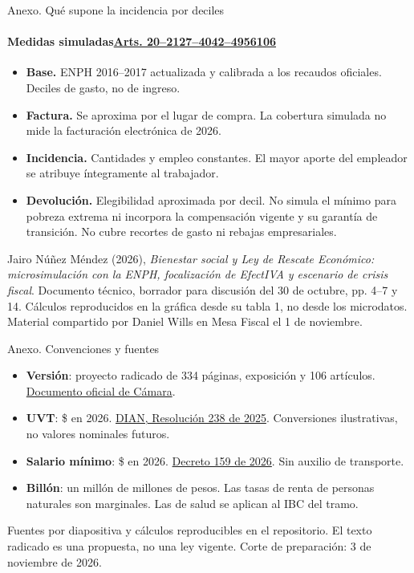 \documentclass[aspectratio=169,11pt]{beamer}
\newcommand{\src}[1]{\par\vfill{\fontsize{7.3}{8.4}\selectfont\color{muted}#1\par}}
\newcommand{\ley}[2]{\href{https://www.camara.gov.co/wp-content/uploads/2026/10/proyectos-ley/documentos/proyecto-36548/PROYECTO-DE-LEY-Rescate-Economico-2026-VSD-RADICADA-1.pdf\#page=#1}{#2}}
\newcommand{\bulletspace}{\setlength\itemsep{7pt}}
\begin{document}
\begin{frame}{Anexo. Qué supone la incidencia por deciles}
\framesubtitle{Medidas simuladas\quad \ley{228}{Arts. 20--21}\quad \ley{234}{27--40}\quad \ley{248}{42--49}\quad \ley{262}{56}\quad \ley{333}{106}}
\begin{itemize}\bulletspace
\item \textbf{Base.} ENPH 2016--2017 actualizada y calibrada a los recaudos oficiales. Deciles de gasto, no de ingreso.
\item \textbf{Factura.} Se aproxima por el lugar de compra. La cobertura simulada no mide la facturación electrónica de 2026.
\item \textbf{Incidencia.} Cantidades y empleo constantes. El mayor aporte del empleador se atribuye íntegramente al trabajador.
\item \textbf{Devolución.} Elegibilidad aproximada por decil. No simula el mínimo para pobreza extrema ni incorpora la compensación vigente y su garantía de transición. No cubre recortes de gasto ni rebajas empresariales.
\end{itemize}
\src{Jairo Núñez Méndez (2026), \emph{Bienestar social y Ley de Rescate Económico: microsimulación con la ENPH, focalización de EfectIVA y escenario de crisis fiscal}. Documento técnico, borrador para discusión del 30 de octubre, pp. 4--7 y 14. Cálculos reproducidos en la gráfica desde su tabla 1, no desde los microdatos. Material compartido por Daniel Wills en Mesa Fiscal el 1 de noviembre.}
\end{frame}

\begin{frame}{Anexo. Convenciones y fuentes}
\small
\begin{itemize}\bulletspace
\item \textbf{Versión}: proyecto radicado de 334 páginas, exposición y 106 artículos. \ley{1}{Documento oficial de Cámara}.
\item \textbf{UVT}: \$\UVTpesos{} en 2026. \href{https://www.dian.gov.co/normatividad/Normatividad/Resoluci\%C3\%B3n\%20000238\%20de\%2015-12-2025.Pdf}{DIAN, Resolución 238 de 2025}. Conversiones ilustrativas, no valores nominales futuros.
\item \textbf{Salario mínimo}: \$\SMpesos{} en 2026. \href{https://normograma.sena.edu.co/compilacion/docs/decreto_0159_2026.htm}{Decreto 159 de 2026}. Sin auxilio de transporte.
\item \textbf{Billón}: un millón de millones de pesos. Las tasas de renta de personas naturales son marginales. Las de salud se aplican al IBC del tramo.
\end{itemize}
\src{Fuentes por diapositiva y cálculos reproducibles en el repositorio. El texto radicado es una propuesta, no una ley vigente. Corte de preparación: 3 de noviembre de 2026.}
\end{frame}
\end{document}
